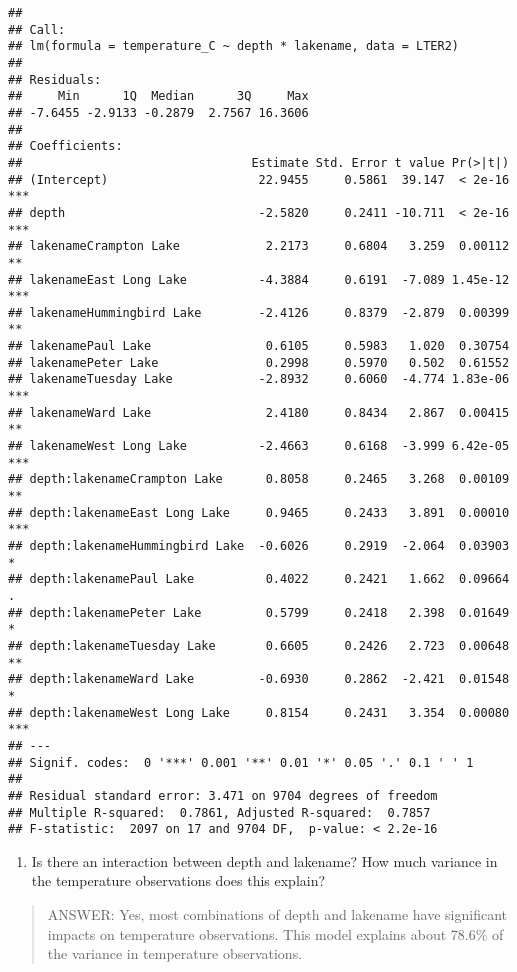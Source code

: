 \documentclass[]{article}
\providecommand{\tightlist}{%
  \setlength{\itemsep}{0pt}\setlength{\parskip}{0pt}}
\begin{document}
\begin{verbatim}
## 
## Call:
## lm(formula = temperature_C ~ depth * lakename, data = LTER2)
## 
## Residuals:
##     Min      1Q  Median      3Q     Max 
## -7.6455 -2.9133 -0.2879  2.7567 16.3606 
## 
## Coefficients:
##                                Estimate Std. Error t value Pr(>|t|)    
## (Intercept)                     22.9455     0.5861  39.147  < 2e-16 ***
## depth                           -2.5820     0.2411 -10.711  < 2e-16 ***
## lakenameCrampton Lake            2.2173     0.6804   3.259  0.00112 ** 
## lakenameEast Long Lake          -4.3884     0.6191  -7.089 1.45e-12 ***
## lakenameHummingbird Lake        -2.4126     0.8379  -2.879  0.00399 ** 
## lakenamePaul Lake                0.6105     0.5983   1.020  0.30754    
## lakenamePeter Lake               0.2998     0.5970   0.502  0.61552    
## lakenameTuesday Lake            -2.8932     0.6060  -4.774 1.83e-06 ***
## lakenameWard Lake                2.4180     0.8434   2.867  0.00415 ** 
## lakenameWest Long Lake          -2.4663     0.6168  -3.999 6.42e-05 ***
## depth:lakenameCrampton Lake      0.8058     0.2465   3.268  0.00109 ** 
## depth:lakenameEast Long Lake     0.9465     0.2433   3.891  0.00010 ***
## depth:lakenameHummingbird Lake  -0.6026     0.2919  -2.064  0.03903 *  
## depth:lakenamePaul Lake          0.4022     0.2421   1.662  0.09664 .  
## depth:lakenamePeter Lake         0.5799     0.2418   2.398  0.01649 *  
## depth:lakenameTuesday Lake       0.6605     0.2426   2.723  0.00648 ** 
## depth:lakenameWard Lake         -0.6930     0.2862  -2.421  0.01548 *  
## depth:lakenameWest Long Lake     0.8154     0.2431   3.354  0.00080 ***
## ---
## Signif. codes:  0 '***' 0.001 '**' 0.01 '*' 0.05 '.' 0.1 ' ' 1
## 
## Residual standard error: 3.471 on 9704 degrees of freedom
## Multiple R-squared:  0.7861, Adjusted R-squared:  0.7857 
## F-statistic:  2097 on 17 and 9704 DF,  p-value: < 2.2e-16
\end{verbatim}

\begin{enumerate}
\def\labelenumi{\arabic{enumi}.}
\setcounter{enumi}{14}
\tightlist
\item
  Is there an interaction between depth and lakename? How much variance
  in the temperature observations does this explain?
\end{enumerate}

\begin{quote}
ANSWER: Yes, most combinations of depth and lakename have significant
impacts on temperature observations. This model explains about 78.6\% of
the variance in temperature observations.
\end{quote}
\end{document}
